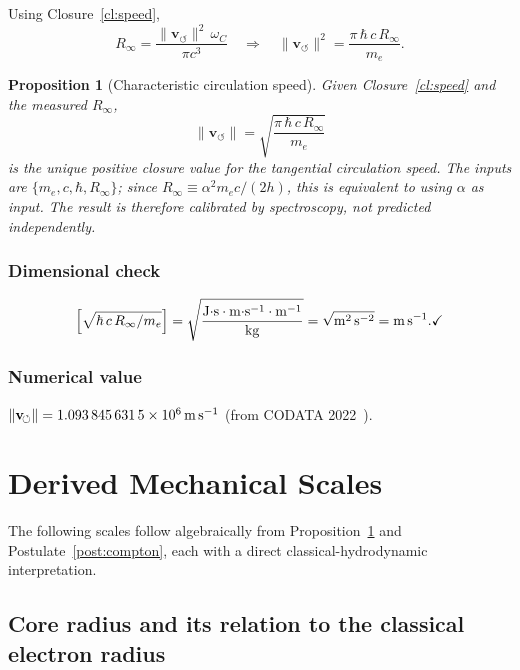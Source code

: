 \documentclass[aps,pra,preprint,longbibliography,nofootinbib]{revtex4-2}
\newtheorem{proposition}{Proposition}
\newcommand{\vnorm}{\lVert\mathbf{v}_{\!\boldsymbol{\circlearrowleft}}\rVert} %
\newcommand{\omC}{\omega_C}                      %
\newcommand{\Rinf}{R_\infty}                     %
\begin{document}
Using Closure~\ref{cl:speed},
\begin{equation}
  \Rinf = \frac{\vnorm^2\,\omC}{\pi c^3}
  \quad\Longrightarrow\quad
  \vnorm^2 = \frac{\pi\,\hbar\,c\,\Rinf}{m_e}.
  \label{eq:vc_solve}
\end{equation}

\begin{proposition}[Characteristic circulation speed]
\label{prop:vc}
Given Closure~\ref{cl:speed} and the measured $\Rinf$,
\begin{equation}
  \boxed{
    \vnorm = \sqrt{\frac{\pi\,\hbar\,c\,\Rinf}{m_e}}
  }
  \label{eq:vc}
\end{equation}
is the unique positive closure value for the tangential
circulation speed.
The inputs are $\{m_e, c, \hbar, \Rinf\}$; since
$\Rinf \equiv \alpha^2 m_e c/(2h)$, this is equivalent to using
$\alpha$ as input.  The result is therefore calibrated by spectroscopy,
not predicted independently.
\end{proposition}

\subsubsection*{Dimensional check}
\[
  \Bigl[\sqrt{\hbar\,c\,\Rinf/m_e}\Bigr]
  = \sqrt{
      \frac{\mathrm{J{\cdot}s\cdot m{\cdot}s^{-1}\cdot m^{-1}}}
           {\mathrm{kg}}
    }
  = \sqrt{\mathrm{m^2\,s^{-2}}} = \mathrm{m\,s^{-1}}. \checkmark
\]

\subsubsection*{Numerical value}
$\vnorm = \SI{1.093\,845\,631\,5e6}{\meter\per\second}$
\quad(from CODATA 2022~\cite{MohrTaylor2022}).

\section{Derived Mechanical Scales}
\label{sec:derived}

The following scales follow algebraically from
Proposition~\ref{prop:vc} and Postulate~\ref{post:compton},
each with a direct classical-hydrodynamic interpretation.

\subsection{Core radius and its relation to the classical electron radius}
\label{sec:rc}
\end{document}
